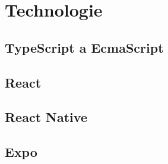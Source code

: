 
\chapter{Technologie}

\section{TypeScript a EcmaScript}

\section{React}

\section{React Native}

\section{Expo}

